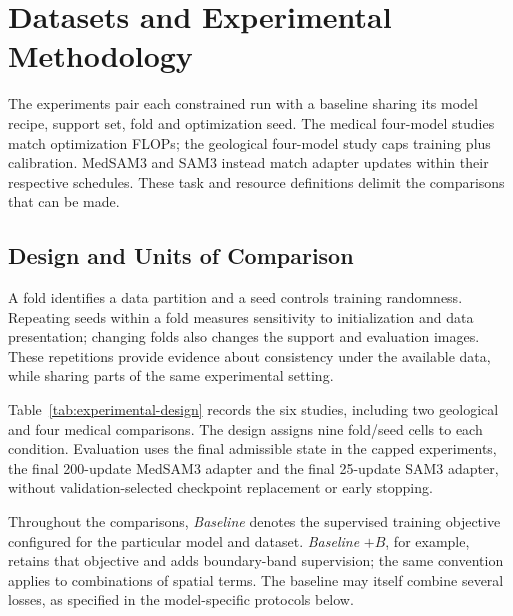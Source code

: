 \documentclass[12pt,a4paper]{article}
\begin{document}
\clearpage
\section{Datasets and Experimental Methodology}
\label{sec:methodology}

The experiments pair each constrained run with a baseline sharing its
model recipe, support set, fold and optimization seed. The medical
four-model studies match optimization FLOPs; the geological four-model
study caps training plus calibration. MedSAM3 and SAM3 instead match
adapter updates within their respective schedules. These task and
resource definitions delimit the comparisons that can be made.

\subsection{Design and Units of Comparison}
\label{sec:experimental-structure}

A fold identifies a data partition and a seed controls training
randomness. Repeating seeds within a fold measures sensitivity to
initialization and data presentation; changing folds also changes the
support and evaluation images. These repetitions provide evidence about
consistency under the available data, while sharing parts of the same
experimental setting.

Table~\ref{tab:experimental-design} records the six studies, including
two geological and four medical comparisons. The design assigns nine fold/seed cells
to each condition. Evaluation uses the final admissible state in the
capped experiments, the final 200-update MedSAM3 adapter and the final
25-update SAM3 adapter, without validation-selected checkpoint
replacement or early stopping.

Throughout the comparisons, \emph{Baseline} denotes the supervised
training objective configured for the particular model and dataset.
\emph{Baseline} $+B$, for example, retains that objective and adds
boundary-band supervision; the same convention applies to combinations
of spatial terms. The baseline may itself combine several losses, as
specified in the model-specific protocols below.
\end{document}
